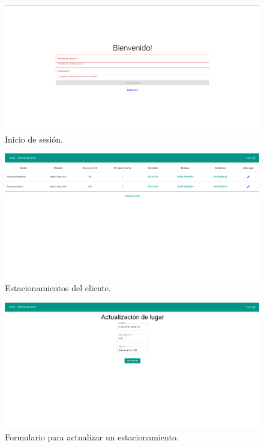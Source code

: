 \begin{figure}
    \centering
    \includegraphics[width=\textwidth]{imgs/server/login.png}
    \caption{Inicio de sesión.}
    \label{fig:login}
\end{figure}

\begin{figure}
    \centering
    \includegraphics[width=\textwidth]{imgs/server/places.png}
    \caption{Estacionamientos del cliente.}
    \label{fig:home}
\end{figure}

\begin{figure}
    \centering
    \includegraphics[width=\textwidth]{imgs/server/update-place.png}
    \caption{Formulario para actualizar un estacionamiento.}
    \label{fig:update-place}
\end{figure}


